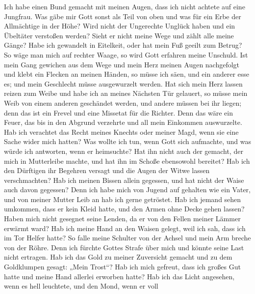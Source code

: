 Ich habe einen Bund gemacht mit meinen Augen, dass ich
nicht achtete auf eine Jungfrau.  Was gäbe mir Gott sonst
als Teil von oben und was für ein Erbe der Allmächtige in der Höhe?
 Wird nicht der Ungerechte Unglück haben und ein Übeltäter
verstoßen werden?  Sieht er nicht meine Wege und zählt
alle meine Gänge?  Habe ich gewandelt in Eitelkeit, oder
hat mein Fuß geeilt zum Betrug?  So wäge man mich auf
rechter Waage, so wird Gott erfahren meine Unschuld.  Ist
mein Gang gewichen aus dem Wege und mein Herz meinen Augen nachgefolgt
und klebt ein Flecken an meinen Händen,  so müsse ich
säen, und ein anderer esse es; und mein Geschlecht müsse ausgewurzelt
werden.  Hat sich mein Herz lassen reizen zum Weibe und
habe ich an meines Nächsten Tür gelauert,  so müsse mein
Weib von einem anderen geschändet werden, und andere müssen bei ihr
liegen;  denn das ist ein Frevel und eine Missetat für
die Richter.  Denn das wäre ein Feuer, das bis in den
Abgrund verzehrte und all mein Einkommen auswurzelte. 
Hab ich verachtet das Recht meines Knechts oder meiner Magd, wenn sie
eine Sache wider mich hatten?  Was wollte ich tun, wenn
Gott sich aufmachte, und was würde ich antworten, wenn er heimsuchte?
 Hat ihn nicht auch der gemacht, der mich in Mutterleibe
machte, und hat ihn im Schoße ebensowohl bereitet?  Hab
ich den Dürftigen ihr Begehren versagt und die Augen der Witwe lassen
verschmachten?  Hab ich meinen Bissen allein gegessen,
und hat nicht der Waise auch davon gegessen?  Denn ich
habe mich von Jugend auf gehalten wie ein Vater, und von meiner Mutter
Leib an hab ich gerne getröstet.  Hab ich jemand sehen
umkommen, dass er kein Kleid hatte, und den Armen ohne Decke gehen
lassen?  Haben mich nicht gesegnet seine Lenden, da er
von den Fellen meiner Lämmer erwärmt ward?  Hab ich meine
Hand an den Waisen gelegt, weil ich sah, dass ich im Tor Helfer hatte?
 So falle meine Schulter von der Achsel und mein Arm
breche von der Röhre.  Denn ich fürchte Gottes Strafe
über mich und könnte seine Last nicht ertragen.  Hab ich
das Gold zu meiner Zuversicht gemacht und zu dem Goldklumpen gesagt:
„Mein Trost``?  Hab ich mich gefreut, dass ich großes Gut
hatte und meine Hand allerlei erworben hatte?  Hab ich
das Licht angesehen, wenn es hell leuchtete, und den Mond, wenn er voll
